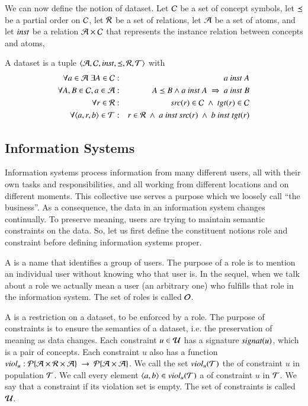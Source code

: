 \documentclass{elsarticle}
\begin{document}
	We can now define the notion of dataset.
	Let	$\mathcal{C}$ be a set of concept symbols,
	let $\preceq$ be a partial order on $\mathcal{C}$,
	let $\mathcal{R}$ be a set of relations,
	let $\mathcal{A}$ be a set of atoms,
	and let $\text{\it inst\/}$ be a relation $\mathcal{A}\times\mathcal{C}$ that represents the instance relation between concepts and atoms,
\begin{definition}[dataset]
	\label{def:dataset}
	\item A dataset is a tuple $\langle\mathcal{A},\mathcal{C},\text{\it inst\/},\preceq,\mathcal{R},\mathcal{T}\rangle$ with
	\begin{eqnarray}
		\forall a\in\atoms\ \exists A\in\concepts&:&a\ \inst\ A\\
		\forall A,B\in\concepts, a\in\atoms&:&A\isa B\wedge a\ \inst\ A\ \Rightarrow\ a\ \inst\ B\\
		\forall r\in\rels&:&\src{r}\in\concepts\ \wedge\ \tgt{r}\in\concepts\\
		\forall\triple{a}{r}{b}\in\triples&:&r\in\rels\ \wedge\ a\ \inst\ \src{r}\ \wedge\ b\ \inst\ \tgt{r}
	\end{eqnarray}
\end{definition}

\subsection{Information Systems}
\label{sct:Information Systems}
	Information systems process information from many different users,
	all with their own tasks and responsibilities,
	and all working from different locations and on different moments.
	This collective use serves a purpose which we loosely call ``the business''.
	As a consequence, the data in an information system changes continually.
	To preserve meaning, users are trying to maintain semantic constraints on the data.
	So, let us first define the constituent notions role and constraint before defining information systems proper.

	A  is a name that identifies a group of users.
	The purpose of a role is to mention an individual user without knowing who that user is.
	In the sequel, when we talk about a role we actually mean a user (an arbitrary one) who fulfills that role in the information system.
	The set of roles is called $\mathcal{O}$.

	A  is a restriction on a dataset, to be enforced by a role.
	The purpose of constraints is to ensure the semantics of a dataset, i.e. the preservation of meaning as data changes.
	Each constraint $u\in\mathcal{U}$ has a signature $\text{\it signat\/}(u)$, which is a pair of concepts.
	Each constraint $u$ also has a function $\id{viol}_u:\powerset{\atoms\times\rels\times\atoms}\ \rightarrow\ \powerset{\atoms\times\atoms}$.
	We call the set $\text{\it viol\/}_{u}(\mathcal{T})$ the  of constraint $u$ in population $\mathcal{T}$.
	We call every element $\langle{a},{b}\rangle\in\text{\it viol\/}_{u}(\mathcal{T})$ a  of constraint $u$ in $\mathcal{T}$.
	We say that a constraint  if its violation set is empty.
	The set of constraints is called $\mathcal{U}$.
\end{document}
